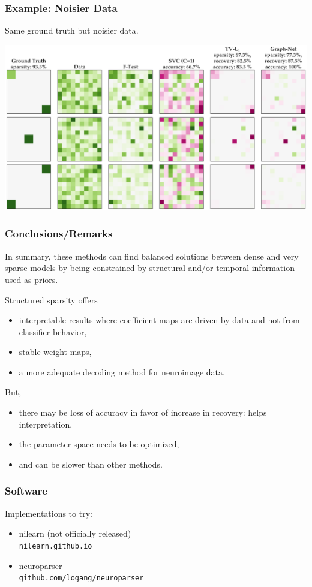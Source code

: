 \documentclass[11pt]{beamer}
\begin{document}
\begin{frame}[t]
  \frametitle{Example: Noisier Data}
  Same ground truth but noisier data.
  \begin{center}
    \includegraphics[scale=0.25]{figures/weights_sparse_synthetic_data_1.39_cbc.png} 
  \end{center}
\end{frame}
\begin{frame}[t,shrink]
  \frametitle{Conclusions/Remarks}
  In summary, these methods can find balanced solutions between dense and very
  sparse models by being constrained by structural and/or temporal information used as
  priors.

  Structured sparsity offers
  \begin{itemize}
  \item interpretable results where coefficient maps are driven by data and
    not from classifier behavior,
  \item stable weight maps,
  \item a more adequate decoding method for neuroimage data.
  \end{itemize}

  But,
  \begin{itemize}
  \item there may be loss of accuracy in favor of increase in recovery: helps
    interpretation,
  \item the parameter space needs to be optimized,
  \item and can be slower than other methods.
  \end{itemize}
\end{frame}
\begin{frame}
  \frametitle{Software}
  Implementations to try:
  \begin{itemize}
  \item nilearn (not officially released) \\
\texttt{nilearn.github.io}

\item neuroparser \\
\texttt{github.com/logang/neuroparser}
  \end{itemize}
\end{frame}
\end{document}
